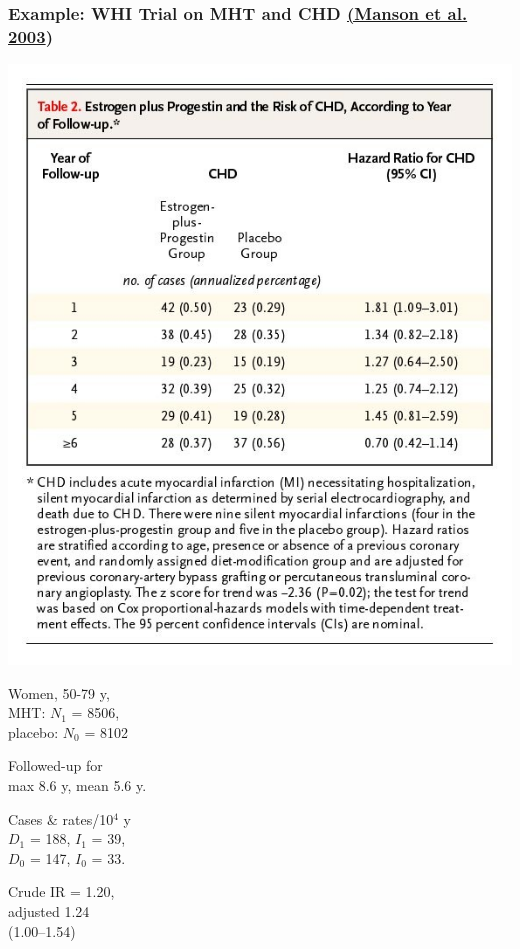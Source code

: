 \documentclass[12pt,dvipsnames,t,aspectratio=169, handout%
]{beamer}
\begin{document}
\begin{frame}
\frametitle{\large Example: WHI Trial on MHT and CHD 
{\small\href{https://doi.org/10.1056/NEJMoa030808}{(Manson et al. 2003}) } } 

\begin{minipage} {0.55\linewidth}
\includegraphics[height=1.1\textheight]{Manson-table2}
\end{minipage}
\hfill
\begin{minipage} {0.35\linewidth}
{\small\raggedright
\bi
\item
Women, 50-79 y, \\
 MHT: $N_1$ = 8506, \\ placebo: $N_0$ = 8102
\item 
Followed-up for \\ max 8.6 y, mean 5.6 y.
\item
Cases \& rates/10$^4$ y \\
$D_1$ = 188, $I_1$ = 39, \\
$D_0$ = 147, $I_0$ = 33.
\item
Crude IR = 1.20, \\
adjusted 1.24 \\ (1.00--1.54)
\ei
}

\end{minipage}

\end{frame}
\end{document}
